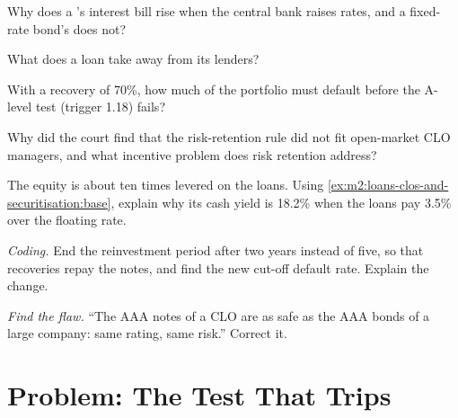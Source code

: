 \begin{exercise}[$\star$]\label{exo:m2:loans-clos-and-securitisation:2}
Why does a 's interest bill rise when the central bank raises rates, and
a fixed-rate bond's does not?
\end{exercise}

\begin{exercise}[$\star$]\label{exo:m2:loans-clos-and-securitisation:3}
What does a  loan take away from its lenders?
\end{exercise}

\begin{exercise}[$\star\star$]\label{exo:m2:loans-clos-and-securitisation:4}
With a recovery of 70\%, how much of the portfolio must default before the A-level
test (trigger 1.18) fails?
\end{exercise}

\begin{exercise}[$\star\star$]\label{exo:m2:loans-clos-and-securitisation:5}
Why did the court find that the risk-retention rule did not fit open-market CLO
managers, and what incentive problem does risk retention address?
\end{exercise}

\begin{exercise}[$\star\star$]\label{exo:m2:loans-clos-and-securitisation:6}
The equity is about ten times levered on the loans. Using \cref{ex:m2:loans-clos-and-securitisation:base},
explain why its cash yield is 18.2\% when the loans pay 3.5\% over the floating rate.
\end{exercise}

\begin{exercise}[$\star\star\star$]\label{exo:m2:loans-clos-and-securitisation:7}
\emph{Coding.} End the reinvestment period after two years instead of five, so that
recoveries repay the notes, and find the new cut-off default rate. Explain the change.
\end{exercise}

\begin{exercise}[$\star\star\star$]\label{exo:m2:loans-clos-and-securitisation:8}
\emph{Find the flaw.} ``The AAA notes of a CLO are as safe as the AAA bonds of a
large company: same rating, same risk.'' Correct it.
\end{exercise}

\section{Problem: The Test That Trips}

